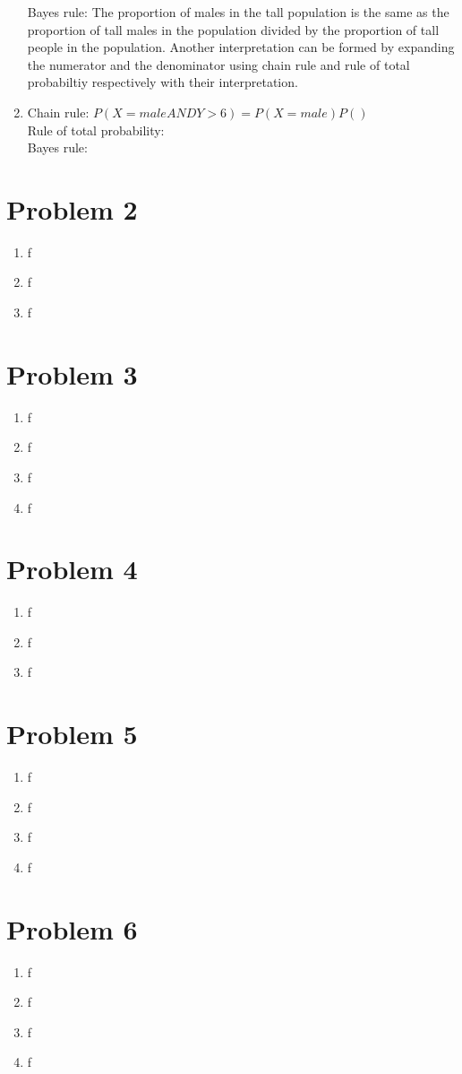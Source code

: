 \documentclass{article}
\begin{document}
\begin{enumerate}
          Bayes rule: The proportion of males in the tall population is the same as the proportion of tall males in the population divided by the proportion of tall people in the population. Another interpretation can be formed by expanding the numerator and the denominator using chain rule and rule of total probabiltiy respectively with their interpretation.
    \item
          Chain rule: $P(X=male AND Y>6)=P(X=male)P()$\\
          Rule of total probability:\\
          Bayes rule:
\end{enumerate}

\section*{Problem 2}
\begin{enumerate}
    \item f
    \item f
    \item f
\end{enumerate}

\section*{Problem 3}
\begin{enumerate}
    \item f
    \item f
    \item f
    \item f
\end{enumerate}

\section*{Problem 4}
\begin{enumerate}
    \item f
    \item f
    \item f
\end{enumerate}

\section*{Problem 5}
\begin{enumerate}
    \item f
    \item f
    \item f
    \item f
\end{enumerate}

\section*{Problem 6}
\begin{enumerate}
    \item f
    \item f
    \item f
    \item f
\end{enumerate}
\end{document}
